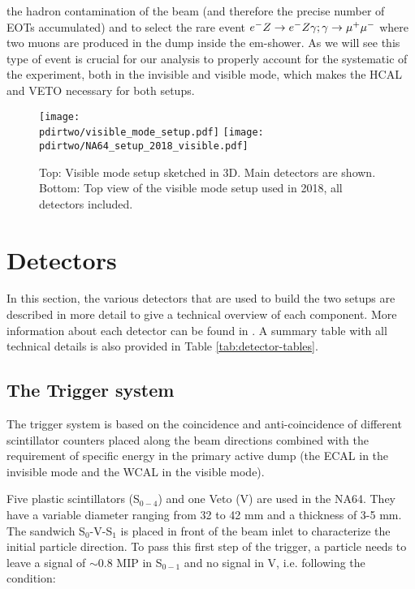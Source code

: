 the hadron contamination of the beam (and therefore the precise number of EOTs accumulated) and to select the rare event $e^- Z \to e^- Z \gamma; \gamma \to \mu^+ \mu^-$ where two muons are produced in the dump inside the em-shower. As we will see this type of event is crucial for our analysis to properly account for the systematic of the experiment, both in the invisible and visible mode, which makes the HCAL and VETO necessary for both setups.

\begin{figure}[tb]
  \centering
  \texttt{[image: \\pdirtwo/visible\_mode\_setup.pdf]}  
  \texttt{[image: \\pdirtwo/NA64\_setup\_2018\_visible.pdf]}
  \caption[NA64 visible mode setup 2018]{Top: Visible mode setup sketched in 3D. Main detectors are shown. Bottom: Top view of the visible mode setup used in 2018, all detectors included.}
  \label{fig:setup-vis-2018}
\end{figure}

\section{Detectors}
\label{ch2:sec:detectors}

In this section, the various detectors that are used to build the two setups are described in more detail to give a technical overview of each component. More information about each detector can be found in \cite{na64-hcal,na64-detectors,ABBON201569}. A summary table with all technical details is also provided in Table \ref{tab:detector-tables}.

\subsection{The Trigger system}
\label{ch2:sec:detectors-trigger}

The trigger system is based on the coincidence and anti-coincidence of different scintillator counters placed along the beam directions combined with the requirement of specific energy in the primary active dump (the ECAL in the invisible mode and the WCAL in the visible mode).

Five plastic scintillators (S$_{0-4}$) and one Veto (V) are used in the NA64. They have a variable diameter ranging from 32 to 42 \si{mm} and a thickness of 3-5 \si{mm}. The sandwich S$_0$-V-S$_1$ is placed in front of the beam inlet to characterize the initial particle direction. To pass this first step of the trigger, a particle needs to leave a signal of $\sim$0.8 MIP in S$_{0-1}$ and no signal in V, i.e. following the condition:

